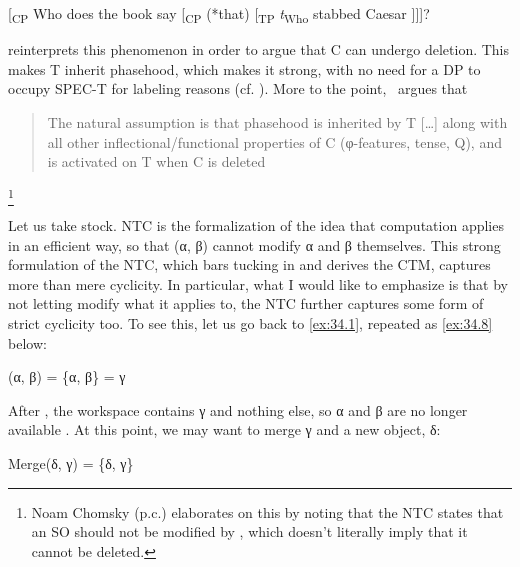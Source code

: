 \documentclass[output=paper]{langsci/langscibook}
\begin{document}
\ea%
    \label{ex:34.7}
    [\textsubscript{CP} Who does the book say [\textsubscript{CP} (*that)
        [\textsubscript{TP} \emph{t}\textsubscript{Who} stabbed Caesar ]]]?
\z

\citet{Chomsky2015} reinterprets this phenomenon in order to argue that C can
undergo deletion. This makes T inherit phasehood, which makes it strong, with
no need for a DP to occupy SPEC-T for labeling reasons (cf.
\citealt{Gallego2017}). More to the point,~\textcite[11]{Chomsky2015} argues
that \blockquote{The natural assumption is that phasehood is inherited by T
    [\dots{}] along with all other inflectional/functional properties of C
    (φ-features, tense, Q), and is activated on T when C is
deleted}.\footnote{Noam Chomsky (p.c.) elaborates on this by noting that the
\gls{NTC} states that an \gls{SO} should not be modified by , which
doesn’t literally imply that it cannot be deleted.}

\largerpage
Let us take stock. \gls{NTC} is the formalization of the idea that computation
applies in an efficient way, so that  (α, β) cannot modify α and β
themselves. This strong formulation of the \gls{NTC}, which bars tucking in and
derives the \gls{CTM}, captures more than mere cyclicity. In particular, what I
would like to emphasize is that by not letting  modify what it applies to,
the \gls{NTC} further captures some form of strict cyclicity too. To see this,
let us go back to \eqref{ex:34.1}, repeated as \eqref{ex:34.8} below:

\ea%
    \label{ex:34.8}
           (α, β) = \{α, β\} = γ
\z

After , the workspace contains γ and nothing else, so α and β are
no longer available \citep[243]{Chomsky1995}. At this point, we may want to
merge γ and a new object, δ:

\ea%
    \label{ex:34.9}
          Merge(δ, γ) = \{δ, γ\}
\z
\end{document}
